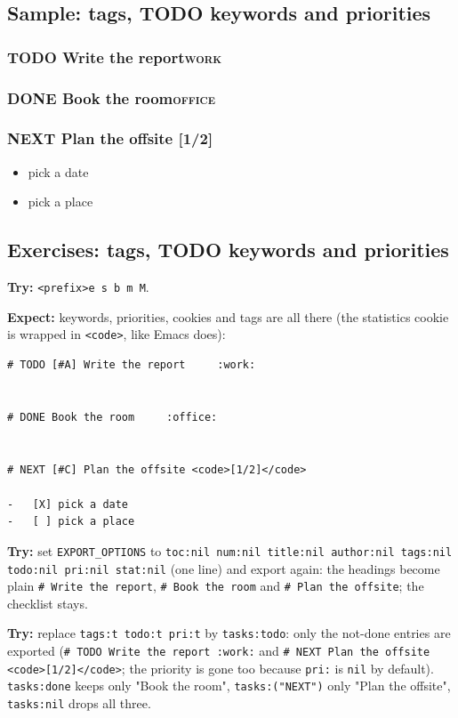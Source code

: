 \subsection{Sample: tags, TODO keywords and priorities}
\label{sec:org3c0e124}
\subsubsection{{\bfseries\sffamily TODO} Write the report\hfill{}\textsc{work}}
\label{sec:org9c43852}
\subsubsection{{\bfseries\sffamily DONE} Book the room\hfill{}\textsc{office}}
\label{sec:orgfd896ea}
\subsubsection{{\bfseries\sffamily NEXT} Plan the offsite [1/2]}
\label{sec:org6063be0}
\begin{itemize}
\item[{$\boxtimes$}] pick a date
\item[{$\square$}] pick a place
\end{itemize}
\subsection{Exercises: tags, TODO keywords and priorities}
\label{sec:org439ff3f}
\textbf{Try:} \texttt{<prefix>e s b m M}.

\textbf{Expect:} keywords, priorities, cookies and tags are all there (the
statistics cookie is wrapped in \texttt{<code>}, like Emacs does):

\begin{verbatim}
# TODO [#A] Write the report     :work:


# DONE Book the room     :office:


# NEXT [#C] Plan the offsite <code>[1/2]</code>

-   [X] pick a date
-   [ ] pick a place
\end{verbatim}

\textbf{Try:} set \texttt{EXPORT\_OPTIONS} to \texttt{toc:nil num:nil title:nil author:nil
tags:nil todo:nil pri:nil stat:nil} (one line) and export again: the
headings become plain \texttt{\# Write the report}, \texttt{\# Book the room} and
\texttt{\# Plan the offsite}; the checklist stays.

\textbf{Try:} replace \texttt{tags:t todo:t pri:t} by \texttt{tasks:todo}: only the not-done
entries are exported (\texttt{\# TODO Write the report     :work:} and
\texttt{\# NEXT Plan the offsite <code>[1/2]</code>}; the priority is gone too
because \texttt{pri:} is \texttt{nil} by default). \texttt{tasks:done} keeps only "Book the
room", \texttt{tasks:("NEXT")} only "Plan the offsite", \texttt{tasks:nil} drops all
three.
